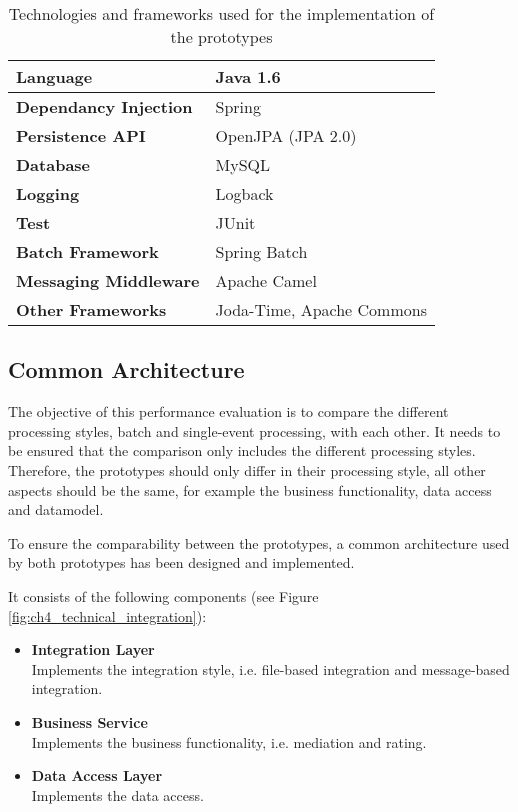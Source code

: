 \begin{table}
	\caption{Technologies and frameworks used for the implementation of the prototypes}
	\label{table:ch4_frameworks}
	\centering
	\begin{tabular}{|l|p{5cm}|}
		\hline
		\bfseries Language & Java 1.6\\
		\hline
		\bfseries Dependancy Injection & Spring\\
		\hline
		\bfseries Persistence API & OpenJPA (JPA 2.0)\\
		\hline
		\bfseries Database & MySQL\\
		\hline
		\bfseries Logging & Logback\\
		\hline 
		\bfseries Test & JUnit\\
		\hline
		\bfseries Batch Framework & Spring Batch\\
		\hline
		\bfseries Messaging Middleware & Apache Camel\\
		\hline
		\bfseries Other Frameworks & Joda-Time, Apache Commons\\
		\hline 
	\end{tabular}
\end{table}

\subsection{Common Architecture} %
\label{sub:ch4_common_architecture}

The objective of this performance evaluation is to compare the different processing styles, batch and single-event processing, with each other.
It needs to be ensured that the comparison only includes the different processing styles. Therefore, the prototypes should only differ in their processing style, all other aspects should be the same, for example the business functionality, data access and datamodel.

To ensure the comparability between the prototypes, a common architecture used by both prototypes has been designed and implemented.

It consists of the following components (see Figure \ref{fig:ch4_technical_integration}):

\begin{itemize}
	\item \textbf{Integration Layer}\\
	Implements the integration style, i.e. file-based integration and message-based integration.
	\item \textbf{Business Service}\\
	Implements the business functionality, i.e. mediation and rating.
	\item \textbf{Data Access Layer}\\Implements the data access.
\end{itemize}

